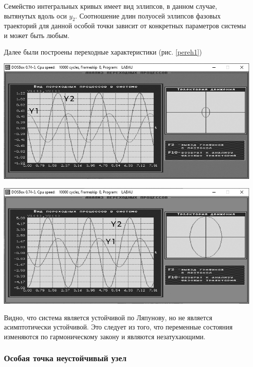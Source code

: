 	Семейство интегральных кривых имеет вид эллипсов, в данном случае, вытянутых вдоль оси $y_2$. Соотношение длин полуосей эллипсов фазовых траекторий для данной особой точки зависит от конкретных параметров системы и может быть любым.
	
	Далее были построены переходные характеристики (рис. \ref{pereh1})
	\vspace{0.5em}
	
	\noindent\begin{minipage}[h]{.5\textwidth}
		\centering\includegraphics[width=.98\textwidth,trim={0 0 0 20px},clip]{Центр/переходной1.png}
	\end{minipage}
	\begin{minipage}[h]{.5\textwidth}
		\centering\includegraphics[width=.98\textwidth,trim={0 0 0 20px},clip]{Центр/переходной2.png}
	\end{minipage}
	{
	\label{pereh1}}

	\vspace{0.5em}
	Видно, что система является устойчивой по Ляпунову, но не является асимптотически устойчивой. Это следует из того, что переменные состояния изменяются по гармоническому закону и являются незатухающими.
	
	\subsubsection{Особая точка неустойчивый узел}
	
